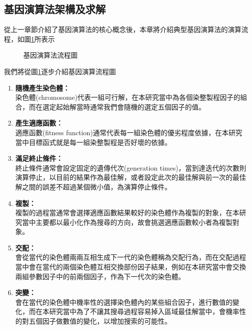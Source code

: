\subsection{基因演算法架構及求解}
\label{c:ch6.3.2}
從上一章節介紹了基因演算法的核心概念後，本章將介紹典型基因演算法的演算流程，如圖\ref{fig:flow4}所表示
\begin{figure}[!htb]
\center

\caption{基因演算法流程圖}
\label{fig:flow4}
\end{figure}
我們將從圖\ref{fig:flow4}逐步介紹基因演算流程圖
\begin{enumerate}[]
\item \textbf{隨機產生染色體：}\\
染色體(chromosome)代表一組可行解，在本研究當中為各個染整製程因子的組合，而在選定起始解當時通常我們會隨機的選定五個因子的值。
\item \textbf{產生適應函數：}\\
適應函數(fitness function)通常代表每一組染色體的優劣程度依據，在本研究當中目標函式就是每一組染整製程是否好壞的依據。
\item \textbf{滿足終止條件：}\\
終止條件通常會設定固定的遺傳代次(generation times)，當到達迭代的次數則演算停止，以目前的結果作為最佳解，或者設定此次的最佳解與前一次的最佳解之間的誤差不超過某個微小值，為演算停止條件。
\item \textbf{複製：}\\
複製的過程當通常會選擇適應函數結果較好的染色體作為複製的對象，在本研究當中主要都以最小化作為搜尋的方向，故會挑選適應函數較小者為複製對象。
\item \textbf{交配：}\\
會從當代的染色體兩兩互相生成下一代的染色體稱為交配行為，而在交配過程當中會在當代的兩個染色體互相交換部份因子結果，例如在本研究當中會交換兩組參數因子中的前兩個因子，作為下一代次的染色體。
\item \textbf{突變：}\\
會在當代的染色體中機率性的選擇染色體內的某些組合因子，進行數值的變化，而在本研究當中為了不讓其搜尋過程容易掉入區域最佳解當中，會機率性的對五個因子做數值的變化，以增加搜索的可能性。
\end{enumerate}

